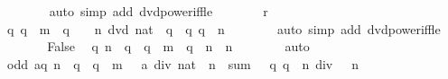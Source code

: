\begin{isabellebody}
\ \ \ \ \ \ \isamarkupfalse%
\ {\isacharparenleft}{\kern0pt}auto\ simp\ add{\isacharcolon}{\kern0pt}\ dvd{\isacharunderscore}{\kern0pt}power{\isacharunderscore}{\kern0pt}iff{\isacharunderscore}{\kern0pt}le{\isacharparenright}{\kern0pt}\isanewline
\ \ \ \ \isamarkupfalse%
\ \isamarkupfalse%
\ r\ \isamarkupfalse%
\ {\isacartoucheopen}{\isacharbraceleft}{\kern0pt}q{\isachardot}{\kern0pt}\ q\ {\isacharless}{\kern0pt}\ m{\isacharbraceright}{\kern0pt}\ {\isasyminter}\ {\isacharbraceleft}{\kern0pt}q{\isachardot}{\kern0pt}\ {\isasymnot}\ {}\ {\isacharcircum}{\kern0pt}\ n\ dvd\ {\isacharparenleft}{\kern0pt}{}{\isacharcolon}{\kern0pt}{\isacharcolon}{\kern0pt}nat{\isacharparenright}{\kern0pt}\ {\isacharcircum}{\kern0pt}\ q{\isacharbraceright}{\kern0pt}\ {\isacharequal}{\kern0pt}\ {\isacharbraceleft}{\kern0pt}q{\isachardot}{\kern0pt}\ q\ {\isacharless}{\kern0pt}\ n{\isacharbraceright}{\kern0pt}{\isacartoucheclose}\isanewline
\ \ \ \ \ \ \isamarkupfalse%
\ {\isacharparenleft}{\kern0pt}auto\ simp\ add{\isacharcolon}{\kern0pt}\ dvd{\isacharunderscore}{\kern0pt}power{\isacharunderscore}{\kern0pt}iff{\isacharunderscore}{\kern0pt}le{\isacharparenright}{\kern0pt}\isanewline
\ \ \ \ \isamarkupfalse%
\ \isamarkupfalse%
\ False\ \isamarkupfalse%
\ {\isacartoucheopen}{\isacharbraceleft}{\kern0pt}q{\isachardot}{\kern0pt}\ n\ {\isasymle}\ q\ {\isasymand}\ q\ {\isacharless}{\kern0pt}\ m\ {\isasymand}\ q\ {\isasymle}\ n{\isacharbraceright}{\kern0pt}\ {\isacharequal}{\kern0pt}\ {\isacharbraceleft}{\kern0pt}n{\isacharbraceright}{\kern0pt}{\isacartoucheclose}\isanewline
\ \ \ \ \ \ \isamarkupfalse%
\ auto\isanewline
\ \ \ \ \isamarkupfalse%
\ \isamarkupfalse%
\ {\isacartoucheopen}odd\ {\isacharparenleft}{\kern0pt}{\isacharparenleft}{\kern0pt}{\isasymSum}a{\isasymin}{\isacharbraceleft}{\kern0pt}q{\isachardot}{\kern0pt}\ n\ {\isasymle}\ q\ {\isasymand}\ q\ {\isacharless}{\kern0pt}\ m{\isacharbraceright}{\kern0pt}{\isachardot}{\kern0pt}\ {}\ {\isacharcircum}{\kern0pt}\ a\ div\ {\isacharparenleft}{\kern0pt}{}{\isacharcolon}{\kern0pt}{\isacharcolon}{\kern0pt}nat{\isacharparenright}{\kern0pt}\ {\isacharcircum}{\kern0pt}\ n{\isacharparenright}{\kern0pt}\ {\isacharplus}{\kern0pt}\ sum\ {\isacharparenleft}{\kern0pt}{\isacharparenleft}{\kern0pt}{\isacharcircum}{\kern0pt}{\isacharparenright}{\kern0pt}\ {}{\isacharparenright}{\kern0pt}\ {\isacharbraceleft}{\kern0pt}q{\isachardot}{\kern0pt}\ q\ {\isacharless}{\kern0pt}\ n{\isacharbraceright}{\kern0pt}\ div\ {}\ {\isacharcircum}{\kern0pt}\ n{\isacharparenright}{\kern0pt}{\isacartoucheclose}\isanewline

\end{isabellebody}
